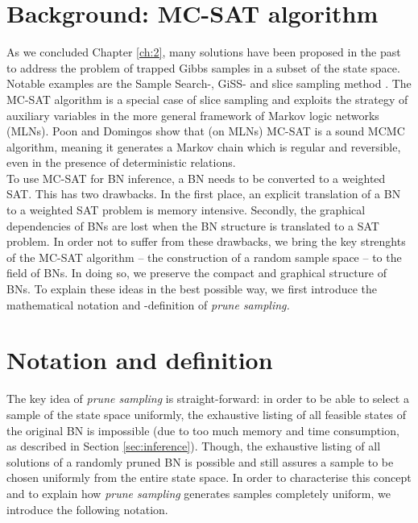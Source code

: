 \documentclass[a4paper, twoside, 11pt]{report}
\theoremstyle{plain}
\theoremstyle{definition}
\theoremstyle{remark}
\newcommand{\ps}{\textit{prune sampling }}
\newcommand{\psp}{\textit{prune sampling. }}
\begin{document}
\section{Background: MC-SAT algorithm}
As we concluded Chapter \ref{ch:2}, many solutions have been proposed in the past to address the problem of trapped Gibbs samples in a subset of the state space. Notable examples are the Sample Search-, GiSS- \cite{venugopal2013giss} and slice sampling method \cite{besag1993spatial, damlen1999gibbs, gilks1996interdisciplinary}. The MC-SAT algorithm \cite{poon2006sound} is a special case of slice sampling and exploits the strategy of auxiliary variables in the more general framework of Markov logic networks (MLNs). Poon and Domingos show that (on MLNs) MC-SAT is a sound MCMC algorithm, meaning it generates a Markov chain which is regular and reversible, even in the presence of deterministic relations. \\

To use MC-SAT for BN inference, a BN needs to be converted to a weighted \gls{SAT}. This has two drawbacks. In the first place, an explicit translation of a BN to a weighted SAT problem is memory intensive. Secondly, the graphical dependencies of BNs are lost when the BN structure is translated to a SAT problem. In order not to suffer from these drawbacks, we bring the key strenghts of the MC-SAT algorithm -- the construction of a random sample space --  to the field of BNs. In doing so, we preserve the compact and graphical structure of BNs. To explain these ideas in the best possible way, we first introduce the mathematical notation and -definition of \psp

\section{Notation and definition}
The key idea of \ps is straight-forward: in order to be able to select a sample of the state space uniformly, the exhaustive listing of all feasible states of the original BN is impossible (due to too much memory and time consumption, as described in Section \ref{sec:inference}). Though, the exhaustive listing of all solutions of a randomly pruned BN is possible and still assures a sample to be chosen uniformly from the entire state space. In order to characterise this concept and to explain how \ps generates samples completely uniform, we introduce the following notation. \\
\end{document}

